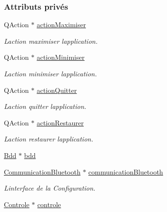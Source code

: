 \subsubsection*{Attributs privés}
\begin{DoxyCompactItemize}
\item 
Q\+Action $\ast$ \hyperlink{class_ihm_groom_aa23dc46d5e223aa20bb84b5bd99d3b81}{action\+Maximiser}
\begin{DoxyCompactList}\small\item\em L\textquotesingle{}action maximiser l\textquotesingle{}application. \end{DoxyCompactList}\item 
Q\+Action $\ast$ \hyperlink{class_ihm_groom_a4018ccf7f73329725e4c54002ae72f01}{action\+Minimiser}
\begin{DoxyCompactList}\small\item\em L\textquotesingle{}action minimiser l\textquotesingle{}application. \end{DoxyCompactList}\item 
Q\+Action $\ast$ \hyperlink{class_ihm_groom_ab28c091688d25e93b2baf99b4aa90f07}{action\+Quitter}
\begin{DoxyCompactList}\small\item\em L\textquotesingle{}action quitter l\textquotesingle{}application. \end{DoxyCompactList}\item 
Q\+Action $\ast$ \hyperlink{class_ihm_groom_aa2df6badfa16f802411b502228fb8704}{action\+Restaurer}
\begin{DoxyCompactList}\small\item\em L\textquotesingle{}action restaurer l\textquotesingle{}application. \end{DoxyCompactList}\item 
\hyperlink{class_bdd}{Bdd} $\ast$ \hyperlink{class_ihm_groom_aba1bfff9bc610e6a626d3af4cec266f9}{bdd}
\item 
\hyperlink{class_communication_bluetooth}{Communication\+Bluetooth} $\ast$ \hyperlink{class_ihm_groom_a8e2b551df75d8dffdfbc9beb6c3691ba}{communication\+Bluetooth}
\begin{DoxyCompactList}\small\item\em L\textquotesingle{}interface de la Configuration. \end{DoxyCompactList}\item 
\hyperlink{class_controle}{Controle} $\ast$ \hyperlink{class_ihm_groom_acead732c303b50a3285bd311ac8a3b4f}{controle}
\item 

\end{DoxyCompactItemize}
